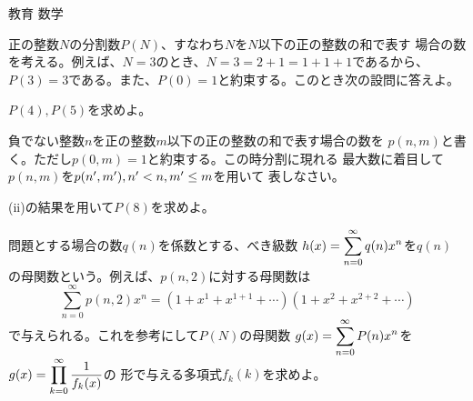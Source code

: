 \documentclass[fleqn]{jbook}
\begin{document}
\begin{question}{教育 数学}{}
\begin{subquestions}
\SubQuestion
  正の整数$N$の分割数$P(N)$、すなわち$N$を$N$以下の正の整数の和で表す
  場合の数を考える。例えば、$N=3$のとき、$N=3=2+1=1+1+1$であるから、
  $P(3)=3$である。また、$P(0)=1$と約束する。このとき次の設問に答えよ。

  \begin{subsubquestions}
  \SubSubQuestion
    $P(4),P(5)$を求めよ。

  \SubSubQuestion
    負でない整数$n$を正の整数$m$以下の正の整数の和で表す場合の数を
    $p(n,m)$と書く。ただし$p(0,m)=1$と約束する。この時分割に現れる
    最大数に着目して$p(n,m)$を$p(n',m'),\\ n'<n,m'\leq m$を用いて
    表しなさい。

  \SubSubQuestion
    (ii)の結果を用いて$P(8)$を求めよ。

  \SubSubQuestion
    問題とする場合の数$q(n)$を係数とする、べき級数
    $h(x)=\displaystyle{\sum_{n=0}^{\infty}q(n)x^n}$を$q(n)$
    の母関数という。例えば、$p(n,2)$に対する母関数は
%
    \[\sum_{n=0}^{\infty}p(n,2)x^n=(1+x^1+x^{1+1}+\cdots)(1+x^2+x^{2+2}+\cdots)\]
%
    で与えられる。これを参考にして$P(N)$の母関数
    $g(x)=\displaystyle{\sum_{n=0}^{\infty}P(n)x^n}$を
    $g(x)=\displaystyle{\prod_{k=0}^{\infty}\frac{1}{f_k(x)}}$の
    形で与える多項式$f_k(k)$を求めよ。
  \end{subsubquestions}
\end{subquestions}
\end{question}
\end{document}

